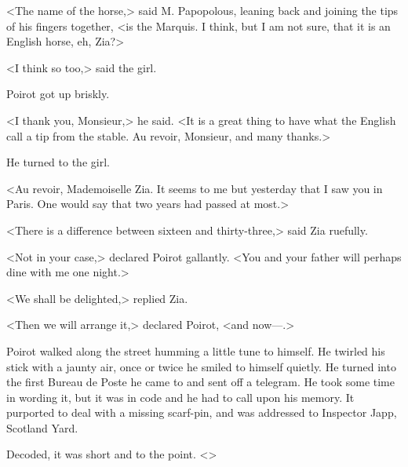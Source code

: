 <The name of the horse,> said M. Papopolous, leaning back and joining the tips of his fingers together, <is the Marquis. I think, but I am not sure, that it is an English horse, eh, Zia?>

<I think so too,> said the girl.

Poirot got up briskly.

<I thank you, Monsieur,> he said. <It is a great thing to have what the English call a tip from the stable. Au revoir, Monsieur, and many thanks.>

He turned to the girl.

<Au revoir, Mademoiselle Zia. It seems to me but yesterday that I saw you in Paris. One would say that two years had passed at most.>

<There is a difference between sixteen and thirty-three,> said Zia ruefully.

<Not in your case,> declared Poirot gallantly. <You and your father will perhaps dine with me one night.>

<We shall be delighted,> replied Zia.

<Then we will arrange it,> declared Poirot, <and now—.>

Poirot walked along the street humming a little tune to himself. He twirled his stick with a jaunty air, once or twice he smiled to himself quietly. He turned into the first Bureau de Poste he came to and sent off a telegram. He took some time in wording it, but it was in code and he had to call upon his memory. It purported to deal with a missing scarf-pin, and was addressed to Inspector Japp, Scotland Yard.

Decoded, it was short and to the point. <>